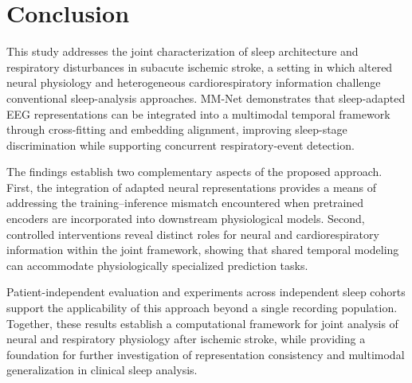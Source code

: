\documentclass[a4paper,fleqn]{cas-sc}
\begin{document}
\section{Conclusion}

This study addresses the joint characterization of sleep architecture and respiratory disturbances in subacute ischemic stroke, a setting in which altered neural physiology and heterogeneous cardiorespiratory information challenge conventional sleep-analysis approaches. MM-Net demonstrates that sleep-adapted EEG representations can be integrated into a multimodal temporal framework through cross-fitting and embedding alignment, improving sleep-stage discrimination while supporting concurrent respiratory-event detection.

The findings establish two complementary aspects of the proposed approach. First, the integration of adapted neural representations provides a means of addressing the training--inference mismatch encountered when pretrained encoders are incorporated into downstream physiological models. Second, controlled interventions reveal distinct roles for neural and cardiorespiratory information within the joint framework, showing that shared temporal modeling can accommodate physiologically specialized prediction tasks.

Patient-independent evaluation and experiments across independent sleep cohorts support the applicability of this approach beyond a single recording population. Together, these results establish a computational framework for joint analysis of neural and respiratory physiology after ischemic stroke, while providing a foundation for further investigation of representation consistency and multimodal generalization in clinical sleep analysis.


\end{document}
